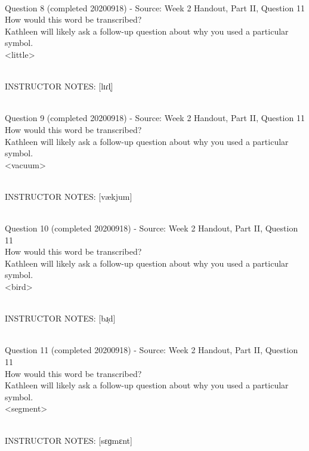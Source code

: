 \documentclass[12pt]{article}
\begin{document}
~\\

{\large Question 8} (completed 20200918) - Source: Week 2 Handout, Part II, Question 11\\

How would this word be transcribed?\\ Kathleen will likely ask a follow-up question about why you used a particular symbol.\\

<little>


~\\
INSTRUCTOR NOTES: [lɪɾl̩]


~\\

{\large Question 9} (completed 20200918) - Source: Week 2 Handout, Part II, Question 11\\

How would this word be transcribed?\\ Kathleen will likely ask a follow-up question about why you used a particular symbol.\\

<vacuum>


~\\
INSTRUCTOR NOTES: [vækjum]


~\\

{\large Question 10} (completed 20200918) - Source: Week 2 Handout, Part II, Question 11\\

How would this word be transcribed?\\ Kathleen will likely ask a follow-up question about why you used a particular symbol.\\

<bird>


~\\
INSTRUCTOR NOTES: [bɹ̩d]


~\\

{\large Question 11} (completed 20200918) - Source: Week 2 Handout, Part II, Question 11\\

How would this word be transcribed?\\ Kathleen will likely ask a follow-up question about why you used a particular symbol.\\

<segment>


~\\
INSTRUCTOR NOTES: [sɛɡmɛnt]
\end{document}
